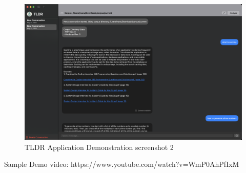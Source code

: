 \begin{figure}[h]
    \centering
    \includegraphics[width=1.0\linewidth]{images/result2.png}
    \caption{TLDR Application Demonstration screenshot 2}
    \label{fig:tldrmodulesinteraction}
\end{figure}

Sample Demo video: https://www.youtube.com/watch?v=WmP0AhPfIxM